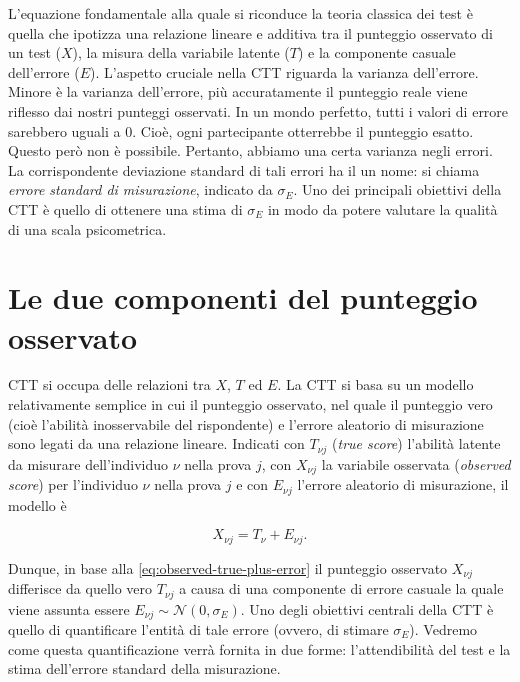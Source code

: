 \documentclass[
  11pt,
]{krantz}
\theoremstyle{definition}
\theoremstyle{definition}
\theoremstyle{definition}
\theoremstyle{definition}
\theoremstyle{remark}
\begin{document}
L'equazione fondamentale alla quale si riconduce la teoria classica dei test è quella che ipotizza una relazione lineare e additiva tra il punteggio osservato di un test (\(X\)), la misura della variabile latente (\(T\)) e la componente casuale dell'errore (\(E\)). L'aspetto cruciale nella CTT riguarda la varianza dell'errore. Minore è la varianza dell'errore, più accuratamente il punteggio reale viene riflesso dai nostri punteggi osservati. In un mondo perfetto, tutti i valori di errore sarebbero uguali a 0. Cioè, ogni partecipante otterrebbe il punteggio esatto. Questo però non è possibile. Pertanto, abbiamo una certa varianza negli errori. La corrispondente deviazione standard di tali errori ha il un nome: si chiama \emph{errore standard di misurazione}, indicato da \(\sigma_E\). Uno dei principali obiettivi della CTT è quello di ottenere una stima di \(\sigma_E\) in modo da potere valutare la qualità di una scala psicometrica.

\hypertarget{le-due-componenti-del-punteggio-osservato}{%
\section{Le due componenti del punteggio osservato}\label{le-due-componenti-del-punteggio-osservato}}

CTT si occupa delle relazioni tra \(X\), \(T\) ed \(E\). La CTT si basa su un modello relativamente semplice in cui il punteggio osservato, nel quale il punteggio vero (cioè l'abilità inosservabile del rispondente) e l'errore aleatorio di misurazione sono legati da una relazione lineare. Indicati con \(T_{\nu j}\) (\emph{true score}) l'abilità latente da misurare dell'individuo \(\nu\) nella prova \(j\), con \(X_{\nu j}\) la variabile osservata (\emph{observed score}) per l'individuo \(\nu\) nella prova \(j\) e con \(E_{\nu j}\) l'errore aleatorio di misurazione, il modello è

\begin{equation}
X_{\nu j} = T_{\nu} + E_{\nu j}. 
\label{eq:observed-true-plus-error}
\end{equation}

Dunque, in base alla \eqref{eq:observed-true-plus-error} il punteggio osservato \(X_{\nu j}\) differisce da quello vero \(T_{\nu j}\) a causa di una componente di errore casuale la quale viene assunta essere \(E_{\nu j} \sim \mathcal{N}(0, \sigma_E)\). Uno degli obiettivi centrali della CTT è quello di quantificare l'entità di tale errore (ovvero, di stimare \(\sigma_E\)). Vedremo come questa quantificazione verrà fornita in due forme: l'attendibilità del test e la stima dell'errore standard della misurazione.
\end{document}
